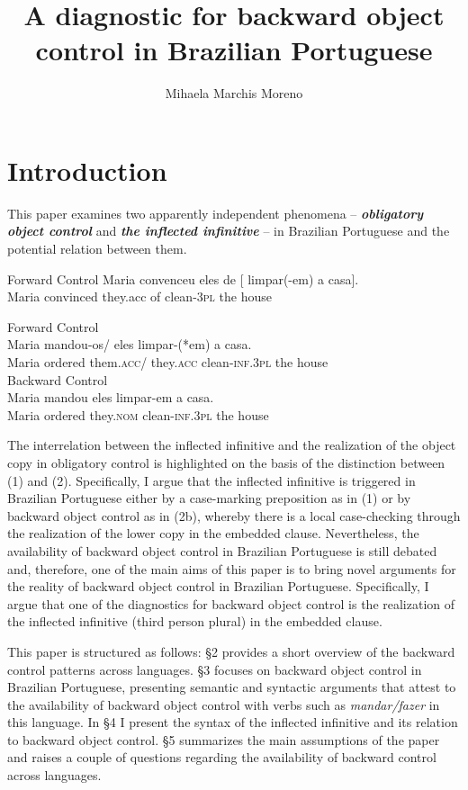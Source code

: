 \documentclass[output=paper]{langsci/langscibook}
\author{Mihaela Marchis Moreno\affiliation{FCSH, Universidade Nova de Lisboa}}
\title{A diagnostic for backward object control in Brazilian Portuguese}
\begin{document}
\section{Introduction}%
This paper examines two apparently independent phenomena – \textbf{\textit{obligatory object control}} and \textbf{\textit{the inflected infinitive} }– in Brazilian Portuguese and the potential relation between them.

\ea%
         Forward Control\label{ex:moreno:1}
    \gll Maria convenceu eles  de  [  limpar(-em)   a     casa].     \\
         Maria   convinced   they.acc of       clean-\textsc{3pl}  the house\\
\z

\ea\label{ex:moreno:2}%
    \ea  Forward Control\\
    \gll Maria  mandou-os/   eles        {\ob}  limpar-(*em) a     casa{\cb}.   \\
         Maria ordered   them.\textsc{acc}/ they.\textsc{acc}      clean-\textsc{inf.3pl} the house\\
    \glt
    \ex  Backward Control\\
    \gll Maria mandou {\ob}    eles    limpar-em     a     casa{\cb}.\\
         Maria  ordered    they.\textsc{nom}      clean-\textsc{inf.3pl}          the house\\
        \z
\z

The interrelation between the inflected infinitive and the realization of the object copy in obligatory control is highlighted on the basis of the distinction between (1) and (2). Specifically, I argue that the inflected infinitive is triggered in Brazilian Portuguese either by a case-marking preposition as in (1) or by backward object control as in (2b), whereby there is a local case-checking through the realization of the lower copy in the embedded clause. Nevertheless, the availability of backward object control in Brazilian Portuguese is still debated and, therefore, one of the main aims of this paper is to bring novel arguments for the reality of backward object control in Brazilian Portuguese. Specifically, I argue that one of the diagnostics for backward object control is the realization of the inflected infinitive (third person plural) in the embedded clause.

This paper is structured as follows: §2 provides a short overview of the backward control patterns across languages. §3 focuses on backward object control in Brazilian Portuguese, presenting semantic and syntactic arguments that attest to the availability of backward object control with verbs such as \textit{mandar/fazer} in this language. In §4 I present the syntax of the inflected infinitive and its relation to backward object control. §5 summarizes the main assumptions of the paper and raises a couple of questions regarding the availability of backward control across languages.
\end{document}

